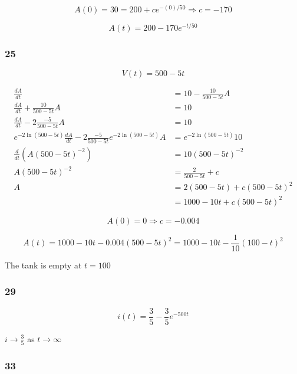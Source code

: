 \documentclass{article}
\begin{document}
\[A(0) = 30 = 200 + c e^{-(0) / 50} \Rightarrow c = -170\]

\[A(t) = 200 - 170 e^{-t / 50}\]

\subsubsection{25}

\[V(t) = 500 - 5 t\]

\begin{align*}
  \frac{dA}{dt}                                                                          & = 10 - \frac{10}{500 - 5 t} A     \\
  \frac{dA}{dt} + \frac{10}{500 - 5 t} A                                                 & = 10                              \\
  \frac{dA}{dt} - 2 \frac{-5}{500 - 5 t} A                                               & = 10                              \\
  e^{-2 \ln (500 - 5 t)} \frac{dA}{dt} - 2 \frac{-5}{500 - 5 t} e^{-2 \ln (500 - 5 t)} A & = e^{-2 \ln (500 - 5 t)} 10       \\
  \frac{d}{dt} (A (500 - 5 t)^{-2})                                                      & = 10 (500 - 5 t)^{-2}             \\
  A (500 - 5 t)^{-2}                                                                     & = \frac{2}{500 - 5 t} + c         \\
  A                                                                                      & = 2 (500 - 5 t) + c (500 - 5 t)^2 \\
                                                                                         & = 1000 - 10 t + c (500 - 5 t)^2
\end{align*}

\[A(0) = 0 \Rightarrow c = -0.004\]

\[A(t) = 1000 - 10 t - 0.004 (500 - 5 t)^2 = 1000 - 10 t - \frac{1}{10} (100 - t)^2\]

The tank is empty at $t = 100$

\subsubsection{29}

\[i(t) = \frac{3}{5} - \frac{3}{5} e^{-500 t}\]

$i \rightarrow \frac{3}{5}$ as $t \rightarrow \infty$

\subsubsection{33}
\end{document}
